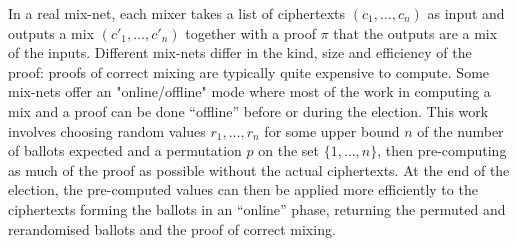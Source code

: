 \documentclass[envcountsame]{llncs}
\begin{document}
In a real mix-net, each mixer takes a list of ciphertexts $(c_1, \ldots, c_n)$
as input and outputs a mix $(c'_1, \ldots, c'_n)$ together with a proof $\pi$
that the outputs are a mix of the inputs. Different mix-nets differ in the kind,
size and efficiency of the proof: proofs of correct mixing are typically
quite expensive to compute. Some mix-nets offer an "online/offline" mode where
most of the work in computing a mix and a proof can be done ``offline'' before
or during the election. This work involves choosing random values $r_1, \ldots,
r_n$ for some upper bound $n$ of the number of ballots expected and a
permutation $p$ on the set $\{1, \ldots, n\}$, then pre-computing as much of the
proof as possible without the actual ciphertexts. At the end of the election,
the pre-computed values can then be applied more efficiently to the ciphertexts
forming the ballots in an ``online'' phase, returning the permuted and
rerandomised ballots and the proof of correct mixing.
\end{document}
